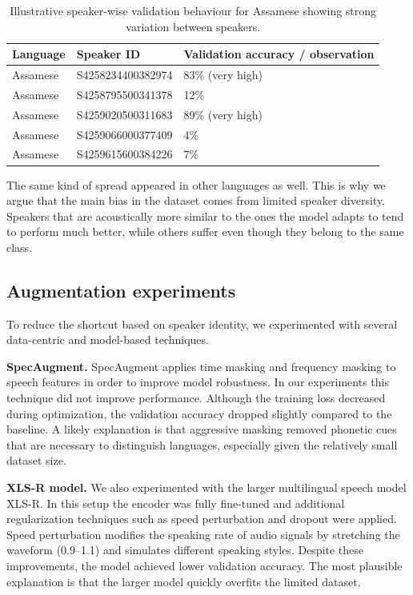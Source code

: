 \documentclass[11pt]{article}
\begin{document}
\begin{table}[t]
\centering
\small
\begin{tabular}{lll}
\toprule
Language & Speaker ID & Validation accuracy / observation \\
\midrule
Assamese & S4258234400382974 & 83\% (very high) \\
Assamese & S4258795500341378 & 12\% \\
Assamese & S4259020500311683 & 89\% (very high) \\
Assamese & S4259066000377409 & 4\% \\
Assamese & S4259615600384226 & 7\%\\
\bottomrule
\end{tabular}
\caption{Illustrative speaker-wise validation behaviour for Assamese showing strong variation between speakers.}
\label{tab:assamese_speakers}
\end{table}
The same kind of spread appeared in other languages as well. This is why we argue that the main bias in the dataset comes from limited speaker diversity. Speakers that are acoustically more similar to the ones the model adapts to tend to perform much better, while others suffer even though they belong to the same class.
\subsection{Augmentation experiments}

To reduce the shortcut based on speaker identity, we experimented with several data-centric and model-based techniques.

\textbf{SpecAugment.} SpecAugment applies time masking and frequency masking to speech features in order to improve model robustness. In our experiments this technique did not improve performance. Although the training loss decreased during optimization, the validation accuracy dropped slightly compared to the baseline. A likely explanation is that aggressive masking removed phonetic cues that are necessary to distinguish languages, especially given the relatively small dataset size.

\textbf{XLS-R model.} We also experimented with the larger multilingual speech model XLS-R. In this setup the encoder was fully fine-tuned and additional regularization techniques such as speed perturbation and dropout were applied. Speed perturbation modifies the speaking rate of audio signals by stretching the waveform (0.9–1.1) and simulates different speaking styles. Despite these improvements, the model achieved lower validation accuracy. The most plausible explanation is that the larger model quickly overfits the limited dataset.
\end{document}
